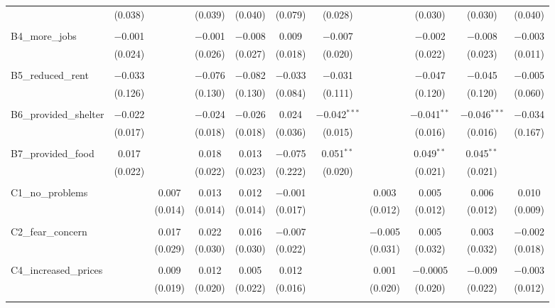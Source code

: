 \begin{table}[H]
\begin{tabular}{@{\extracolsep{4pt}}lcccccccccc}
  & (0.038) &  & (0.039) & (0.040) & (0.079) & (0.028) &  & (0.030) & (0.030) & (0.040) \\ 
  & & & & & & & & & & \\ 
 B4\_more\_jobs & $-$0.001 &  & $-$0.001 & $-$0.008 & 0.009 & $-$0.007 &  & $-$0.002 & $-$0.008 & $-$0.003 \\ 
  & (0.024) &  & (0.026) & (0.027) & (0.018) & (0.020) &  & (0.022) & (0.023) & (0.011) \\ 
  & & & & & & & & & & \\ 
 B5\_reduced\_rent & $-$0.033 &  & $-$0.076 & $-$0.082 & $-$0.033 & $-$0.031 &  & $-$0.047 & $-$0.045 & $-$0.005 \\ 
  & (0.126) &  & (0.130) & (0.130) & (0.084) & (0.111) &  & (0.120) & (0.120) & (0.060) \\ 
  & & & & & & & & & & \\ 
 B6\_provided\_shelter & $-$0.022 &  & $-$0.024 & $-$0.026 & 0.024 & $-$0.042$^{***}$ &  & $-$0.041$^{**}$ & $-$0.046$^{***}$ & $-$0.034 \\ 
  & (0.017) &  & (0.018) & (0.018) & (0.036) & (0.015) &  & (0.016) & (0.016) & (0.167) \\ 
  & & & & & & & & & & \\ 
 B7\_provided\_food & 0.017 &  & 0.018 & 0.013 & $-$0.075 & 0.051$^{**}$ &  & 0.049$^{**}$ & 0.045$^{**}$ &  \\ 
  & (0.022) &  & (0.022) & (0.023) & (0.222) & (0.020) &  & (0.021) & (0.021) &  \\ 
  & & & & & & & & & & \\ 
 C1\_no\_problems &  & 0.007 & 0.013 & 0.012 & $-$0.001 &  & 0.003 & 0.005 & 0.006 & 0.010 \\ 
  &  & (0.014) & (0.014) & (0.014) & (0.017) &  & (0.012) & (0.012) & (0.012) & (0.009) \\ 
  & & & & & & & & & & \\ 
 C2\_fear\_concern &  & 0.017 & 0.022 & 0.016 & $-$0.007 &  & $-$0.005 & 0.005 & 0.003 & $-$0.002 \\ 
  &  & (0.029) & (0.030) & (0.030) & (0.022) &  & (0.031) & (0.032) & (0.032) & (0.018) \\ 
  & & & & & & & & & & \\ 
 C4\_increased\_prices &  & 0.009 & 0.012 & 0.005 & 0.012 &  & 0.001 & $-$0.0005 & $-$0.009 & $-$0.003 \\ 
  &  & (0.019) & (0.020) & (0.022) & (0.016) &  & (0.020) & (0.020) & (0.022) & (0.012) \\ 
  & & & & & & & & & & \\ 

\end{tabular}
\end{table}
